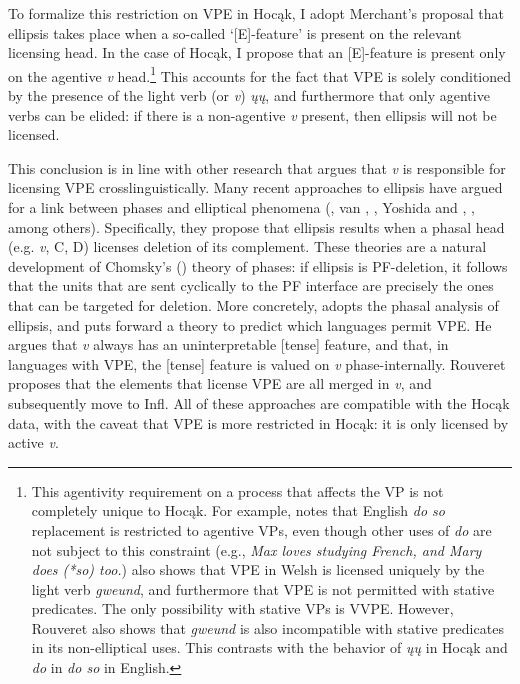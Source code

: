 \documentclass[output=paper]{LSP/langsci}
\begin{document}
To formalize this restriction on VPE in Hocąk, I adopt Merchant's  proposal that ellipsis takes place when a so-called `[E]-feature' is present on the relevant licensing head. In the case of Hocąk, I propose that an [E]-feature is present only on the agentive \emph{v} head.\footnote{This agentivity requirement on a process that affects the VP is not completely unique to Hocąk. For example, \citet{Hallman2004} notes that English \emph{do so} replacement is restricted to agentive VPs, even though other uses of \emph{do} are not subject to this constraint (e.g., \emph{Max loves studying French, and Mary does (*so) too.}) \citet{Rouveret2012} also shows that VPE in Welsh is licensed uniquely by the light verb \emph{gweund}, and furthermore that VPE is not permitted with stative predicates. The only possibility with stative VPs is VVPE. However, Rouveret also shows that \emph{gweund} is also incompatible with stative predicates in its non-elliptical uses. This contrasts with the behavior of \emph{ųų} in Hocąk and \emph{do} in \emph{do so} in English.}  This accounts for the fact that VPE is solely conditioned by the presence of the light verb (or \emph{v}) \emph{ųų}, and furthermore that only agentive verbs can be elided: if there is a non-agentive \emph{v} present, then ellipsis will not be licensed. 

This conclusion is in line with other research that argues that \emph{v} is responsible for licensing VPE crosslinguistically. Many recent approaches to ellipsis have argued for a link between phases and elliptical phenomena (\citealt{Holmberg2001}, van \citealt{Craenenbroeck2004}, \citealt{Gengel2007}, Yoshida and \citealt{Gallego2008}, \citealt{Gallego2009}, among others). Specifically, they propose that ellipsis results when a phasal head (e.g. \emph{v}, C, D) licenses deletion of its complement. These theories are a natural development of Chomsky's (\citeyear{Chomsky2000,Chomsky2001,Chomsky2004}) theory of phases: if ellipsis is PF-deletion, it follows that the units that are sent cyclically to the PF interface are precisely the ones that can be targeted for deletion. More concretely, \citet{Rouveret2012} adopts the phasal analysis of ellipsis, and puts forward a theory to predict which languages permit VPE. He argues that \emph{v} always has an uninterpretable [tense] feature, and that, in languages with VPE, the [tense] feature is valued on \emph{v} phase-internally. Rouveret proposes that the elements that license VPE are all merged in \emph{v}, and subsequently move to Infl. All of these approaches are compatible with the Hocąk data, with the caveat that VPE is more restricted in Hocąk: it is only licensed by active \emph{v}.
\end{document}
